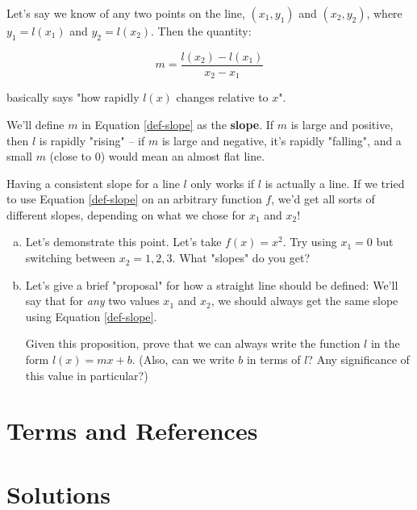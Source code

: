 Let's say we know of any two points on the line, $(x_1, y_1)$ and $(x_2, y_2)$, where $y_1 = l(x_1)$ and $y_2 = l(x_2)$. Then the quantity:

\begin{equation}
\label{def-slope}
m = \frac{l(x_2) - l(x_1)}{x_2 - x_1}
\end{equation}

basically says "how rapidly $l(x)$ changes relative to $x$". 

We'll define $m$ in Equation \ref{def-slope} as the \textbf{slope}. If $m$ is large and positive, then $l$ is rapidly "rising" -- if $m$ is large and negative, it's rapidly "falling", and a small $m$ (close to 0) would mean an almost flat line.

\begin{exercise}
\label{slope-qns}
Having a consistent slope for a line $l$ only works if $l$ is actually a line. If we tried to use Equation \ref{def-slope} on an arbitrary function $f$, we'd get all sorts of different slopes, depending on what we chose for $x_1$ and $x_2$!

\vspace{2in}

\begin{enumerate}[(a)]
\item Let's demonstrate this point. Let's take $f(x) = x^2$. Try using $x_1 = 0$ but switching between $x_2 = 1, 2, 3$. What "slopes" do you get?

\item Let's give a brief "proposal" for how a straight line should be defined: We'll say that for \textit{any} two values $x_1$ and $x_2$, we should always get the same slope using Equation \ref{def-slope}. 

Given this proposition, prove that we can always write the function $l$ in the form $l(x) = mx + b$. (Also, can we write $b$ in terms of $l$? Any significance of this value in particular?)
\end{enumerate}
\end{exercise}



\newpage
\section{Terms and References}

\section{Solutions}

